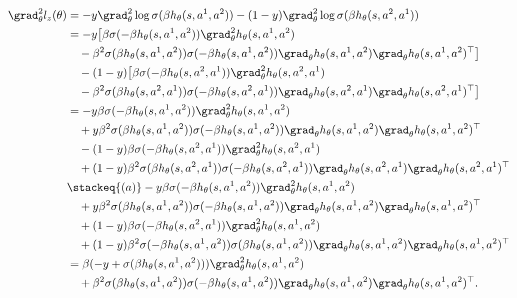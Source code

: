 \begin{align*}
    \grad_\theta^2 l_z(\theta) &= -y\grad_\theta^2 \log\sigma(\beta h_\theta(s,a^1,a^2)) - (1-y)\grad_\theta^2 \log\sigma(\beta h_\theta(s,a^2,a^1)) \\
    &= -y \big[\beta\sigma(-\beta h_\theta(s,a^1,a^2))\grad_\theta^2 h_\theta(s,a^1,a^2) \\
    &\quad- \beta^2\sigma(\beta h_\theta(s,a^1,a^2))\sigma(-\beta h_\theta(s,a^1,a^2))\grad_\theta h_\theta(s,a^1,a^2)\grad_\theta h_\theta(s,a^1,a^2)^{\top} \big] \\
    &\quad -(1-y)\big[\beta\sigma(-\beta h_\theta(s,a^2,a^1))\grad_\theta^2 h_\theta(s,a^2,a^1) \\
    &\quad -\beta^2\sigma(\beta h_\theta(s,a^2,a^1))\sigma(-\beta h_\theta(s,a^2,a^1))\grad_\theta h_\theta(s,a^2,a^1)\grad_\theta h_\theta(s,a^2,a^1)^{\top} \big] \\
    &= -y \beta\sigma(-\beta h_\theta(s,a^1,a^2))\grad_\theta^2 h_\theta(s,a^1,a^2) \\
    &\quad+ y \beta^2\sigma(\beta h_\theta(s,a^1,a^2))\sigma(-\beta h_\theta(s,a^1,a^2))\grad_\theta h_\theta(s,a^1,a^2)\grad_\theta h_\theta(s,a^1,a^2)^{\top}  \\
    &\quad -(1-y)\beta\sigma(-\beta h_\theta(s,a^2,a^1))\grad_\theta^2 h_\theta(s,a^2,a^1) \\
    &\quad +(1-y)\beta^2\sigma(\beta h_\theta(s,a^2,a^1))\sigma(-\beta h_\theta(s,a^2,a^1))\grad_\theta h_\theta(s,a^2,a^1)\grad_\theta h_\theta(s,a^2,a^1)^{\top}  \\
    &\stackeq{(a)} -y \beta\sigma(-\beta h_\theta(s,a^1,a^2))\grad_\theta^2 h_\theta(s,a^1,a^2) \\
    &\quad+ y \beta^2\sigma(\beta h_\theta(s,a^1,a^2))\sigma(-\beta h_\theta(s,a^1,a^2))\grad_\theta h_\theta(s,a^1,a^2)\grad_\theta h_\theta(s,a^1,a^2)^{\top}  \\
    &\quad +(1-y)\beta\sigma(-\beta h_\theta(s,a^2,a^1))\grad_\theta^2 h_\theta(s,a^1,a^2) \\
    &\quad +(1-y)\beta^2\sigma(-\beta h_\theta(s,a^1,a^2))\sigma(\beta h_\theta(s,a^1,a^2))\grad_\theta h_\theta(s,a^1,a^2)\grad_\theta h_\theta(s,a^1,a^2)^{\top}  \\
    &= \beta (-y+\sigma(\beta h_\theta(s,a^1,a^2))) \grad_\theta^2 h_\theta(s,a^1,a^2) \\
    &\quad + \beta^2\sigma(\beta h_\theta(s,a^1,a^2))\sigma(-\beta h_\theta(s,a^1,a^2))\grad_\theta h_\theta(s,a^1,a^2)\grad_\theta h_\theta(s,a^1,a^2)^{\top}.
\end{align*}
